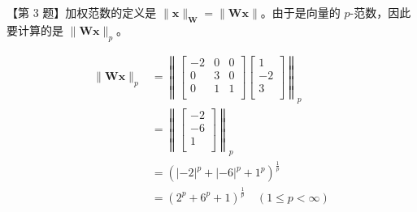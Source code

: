 \documentclass[UTF8]{ctexart}
\newcommand\x{\boldsymbol{x}}
\newcommand\W{\boldsymbol{W}}
\begin{document}
\newpage
{}
\BgThispage
【第 3 题】加权范数的定义是 $\|\x\|_{\W} = \|\W\x\|$。由于是向量的 $p$-范数，因此要计算的是 $\|\W\x\|_p$。

\begin{align*}
  \|\W\x\|_p &= \left\| \begin{bmatrix}
                          -2 & 0 & 0 \\
                         0 & 3 & 0 \\
                         0 & 1 & 1 \\
                        \end{bmatrix}\begin{bmatrix}
                                       1 \\ -2 \\ 3 \\
                        \end{bmatrix} \right\|_p  \\
    &= \left\|\begin{bmatrix}
         -2 \\ -6 \\ 1 \\
       \end{bmatrix}\right\|_p \\
    &= (|-2|^p + |-6|^p + 1^p)^{\frac{1}{p}} \\
    &= (2^p + 6^p + 1)^{\frac1p} \quad (1\leqslant p < \infty)\\
\end{align*}
\end{document}
